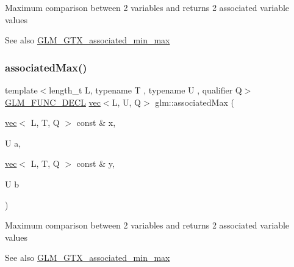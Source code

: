 Maximum comparison between 2 variables and returns 2 associated variable values \begin{DoxySeeAlso}{See also}
\hyperlink{group__gtx__associated__min__max}{G\+L\+M\+\_\+\+G\+T\+X\+\_\+associated\+\_\+min\+\_\+max} 
\end{DoxySeeAlso}
\mbox{\label{group__gtx__associated__min__max_ga4086269afabcb81dd7ded33cb3448653}} 
\subsubsection{\texorpdfstring{associated\+Max()}{associatedMax()}\hspace{0.1cm}{\footnotesize\ttfamily [4/12]}}
{\footnotesize\ttfamily template$<$length\+\_\+t L, typename T , typename U , qualifier Q$>$ \\
\hyperlink{setup_8hpp_ab2d052de21a70539923e9bcbf6e83a51}{G\+L\+M\+\_\+\+F\+U\+N\+C\+\_\+\+D\+E\+CL} \hyperlink{structglm_1_1vec}{vec}$<$L, U, Q$>$ glm\+::associated\+Max (\begin{DoxyParamCaption}\item[{\hyperlink{structglm_1_1vec}{vec}$<$ L, T, Q $>$ const \&}]{x,  }\item[{U}]{a,  }\item[{\hyperlink{structglm_1_1vec}{vec}$<$ L, T, Q $>$ const \&}]{y,  }\item[{U}]{b }\end{DoxyParamCaption})}

Maximum comparison between 2 variables and returns 2 associated variable values \begin{DoxySeeAlso}{See also}
\hyperlink{group__gtx__associated__min__max}{G\+L\+M\+\_\+\+G\+T\+X\+\_\+associated\+\_\+min\+\_\+max} 
\end{DoxySeeAlso}
\mbox{\label{group__gtx__associated__min__max_gaec891e363d91abbf3a4443cf2f652209}} 
